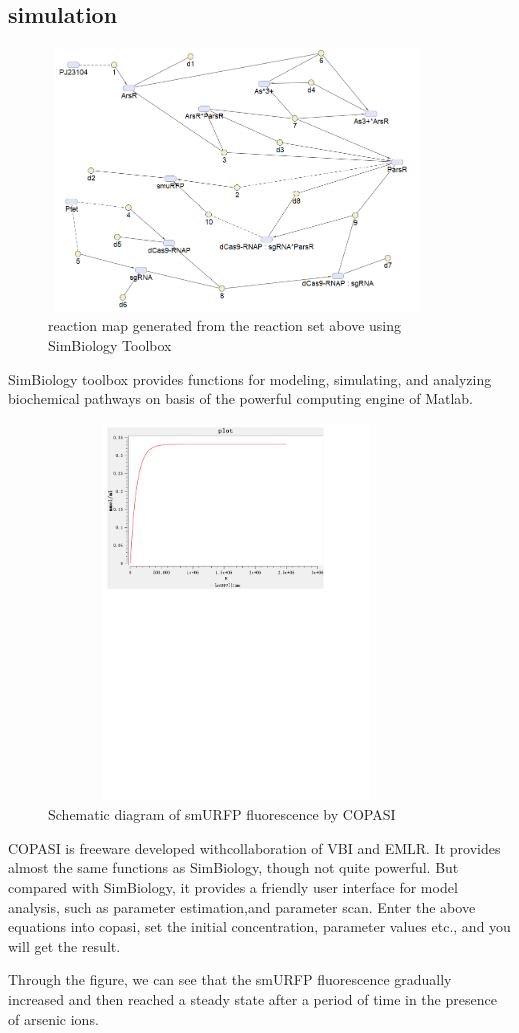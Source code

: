 \subsection{simulation }
\begin{figure}[h]
	\centering
	\includegraphics[width=10cm,height=7cm]{screenshot003}	
	\caption{reaction map generated from the reaction set above using SimBiology Toolbox}
\end{figure}
SimBiology toolbox provides functions for modeling, simulating, and analyzing biochemical pathways on basis of the powerful computing engine of Matlab.

\begin{figure}[h]
	\centering
	\includegraphics[width=10cm,height=10cm]{smuRFP}
	\caption{Schematic diagram of smURFP fluorescence by COPASI}
\end{figure}



COPASI is freeware developed withcollaboration of VBI and EMLR. It provides
almost the same functions as SimBiology, though not quite powerful. But compared with SimBiology, it provides a friendly user interface for model analysis, such as parameter estimation,and parameter scan. Enter the above equations into copasi, set the initial concentration, parameter values etc., and you will get the result.

Through the figure, we can see that the smURFP fluorescence gradually increased and then reached a steady state after a period of time  in the presence of arsenic ions.







